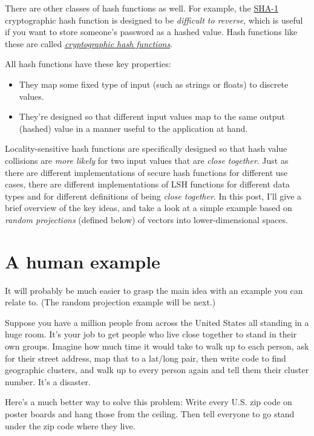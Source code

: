 \documentclass[20pt,]{extarticle}
\providecommand{\tightlist}{%
  \setlength{\itemsep}{0pt}\setlength{\parskip}{0pt}}
\begin{document}
There are other classes of hash functions as well. For example, the
\href{https://en.wikipedia.org/wiki/SHA-1}{SHA-1} cryptographic hash
function is designed to be \emph{difficult to reverse}, which is useful
if you want to store someone's password as a hashed value. Hash
functions like these are called
\href{https://en.wikipedia.org/wiki/Cryptographic_hash_function}{\emph{cryptographic
hash functions}}.

All hash functions have these key properties:

\begin{itemize}
\tightlist
\item
  They map some fixed type of input (such as strings or floats) to
  discrete values.
\item
  They're designed so that different input values map to the same output
  (hashed) value in a manner useful to the application at hand.
\end{itemize}

Locality-sensitive hash functions are specifically designed so that hash
value collisions are \emph{more likely} for two input values that are
\emph{close together}. Just as there are different implementations of
secure hash functions for different use cases, there are different
implementations of LSH functions for different data types and for
different definitions of being \emph{close together}. In this post, I'll
give a brief overview of the key ideas, and take a look at a simple
example based on \emph{random projections} (defined below) of vectors
into lower-dimensional spaces.

\section{A human example}\label{a-human-example}

It will probably be much easier to grasp the main idea with an example
you can relate to. (The random projection example will be next.)

Suppose you have a million people from across the United States all
standing in a huge room. It's your job to get people who live close
together to stand in their own groups. Imagine how much time it would
take to walk up to each person, ask for their street address, map that
to a lat/long pair, then write code to find geographic clusters, and
walk up to every person again and tell them their cluster number. It's a
disaster.

Here's a much better way to solve this problem: Write every U.S. zip
code on poster boards and hang those from the ceiling. Then tell
everyone to go stand under the zip code where they live.
\end{document}
